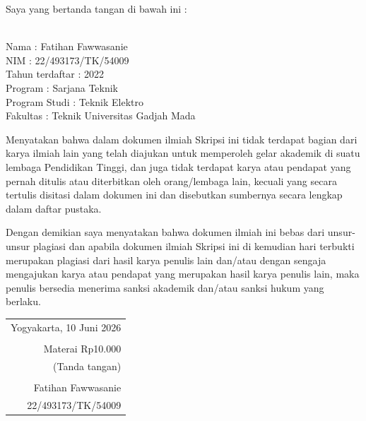 \noindent Saya yang bertanda tangan di bawah ini :

\vspace{-1em}

\begin{tabbing}
\hspace{40mm} \= \\ %
\noindent Nama \> : Fatihan Fawwasanie \\[\parskip]
\noindent NIM \> : 22/493173/TK/54009 \\[\parskip]
\noindent Tahun terdaftar \> : 2022 \\[\parskip]
\noindent Program \> : Sarjana Teknik \\[\parskip]
\noindent Program Studi \> : Teknik Elektro \\[\parskip]
\noindent Fakultas \> : Teknik Universitas Gadjah Mada
\end{tabbing}

\noindent Menyatakan bahwa dalam dokumen ilmiah Skripsi ini tidak terdapat bagian dari karya ilmiah lain yang telah diajukan untuk memperoleh gelar akademik di suatu lembaga Pendidikan Tinggi, dan juga tidak terdapat karya atau pendapat yang pernah ditulis atau diterbitkan oleh orang/lembaga lain, kecuali yang secara tertulis disitasi dalam dokumen ini dan disebutkan sumbernya secara lengkap dalam daftar pustaka.

\noindent Dengan demikian saya menyatakan bahwa dokumen ilmiah ini bebas dari unsur-unsur plagiasi dan apabila dokumen ilmiah Skripsi ini di kemudian hari terbukti merupakan plagiasi dari hasil karya penulis lain dan/atau dengan sengaja mengajukan karya atau pendapat yang merupakan hasil karya penulis lain, maka penulis bersedia menerima sanksi akademik dan/atau sanksi hukum yang berlaku.


\begin{flushright}
	\begin{tabular}{r}
		Yogyakarta, 10 Juni 2026 \\
		\vspace{0.1cm} \\
		\tiny{Materai Rp10.000} \\
		\tiny{(Tanda tangan)} \\	
		\vspace{0.1cm} \\
		Fatihan Fawwasanie \\ 22/493173/TK/54009
	\end{tabular}
\end{flushright}
